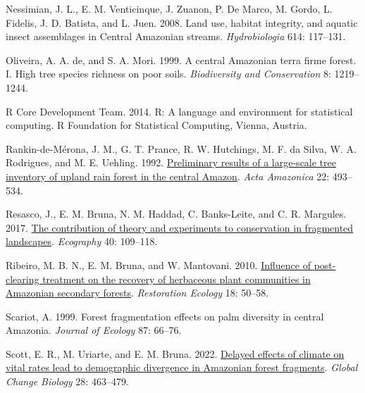 \documentclass[
  12pt,
  man, donotrepeattitle,floatsintext]{apa6}
\newlength{\cslhangindent}
\newlength{\cslentryspacingunit} %
\newenvironment{CSLReferences}[2] %
 {%
  \setlength{\parindent}{0pt}
  \ifodd #1
  \let\oldpar\par
  \def\par{\hangindent=\cslhangindent\oldpar}
  \fi
  \setlength{\parskip}{#2\cslentryspacingunit}
 }%
 {}
\begin{document}
\begin{CSLReferences}{1}{0}
\leavevmode{}%
Nessimian, J. L., E. M. Venticinque, J. Zuanon, P. De Marco, M. Gordo, L. Fidelis, J. D. Batista, and L. Juen. 2008. Land use, habitat integrity, and aquatic insect assemblages in {Central} {Amazonian} streams. \emph{Hydrobiologia} 614: 117--131.

\leavevmode{}%
Oliveira, A. A. de, and S. A. Mori. 1999. A central {Amazonian} terra firme forest. {I}. {High} tree species richness on poor soils. \emph{Biodiversity and Conservation} 8: 1219--1244.

\leavevmode{}%
R Core Development Team. 2014. R: {A} language and environment for statistical computing. R Foundation for Statistical Computing, Vienna, Austria.

\leavevmode{}%
Rankin-de-Mérona, J. M., G. T. Prance, R. W. Hutchings, M. F. da Silva, W. A. Rodrigues, and M. E. Uehling. 1992. \href{https://doi.org/10.1590/1809-43921992224534}{Preliminary results of a large-scale tree inventory of upland rain forest in the central {Amazon}}. \emph{Acta Amazonica} 22: 493--534.

\leavevmode{}%
Resasco, J., E. M. Bruna, N. M. Haddad, C. Banks-Leite, and C. R. Margules. 2017. \href{https://doi.org/10.1111/ecog.02546}{The contribution of theory and experiments to conservation in fragmented landscapes}. \emph{Ecography} 40: 109--118.

\leavevmode{}%
Ribeiro, M. B. N., E. M. Bruna, and W. Mantovani. 2010. \href{https://doi.org/10.1111/j.1526-100X.2010.00715.x}{Influence of post-clearing treatment on the recovery of herbaceous plant communities in {Amazonian} secondary forests}. \emph{Restoration Ecology} 18: 50--58.

\leavevmode{}%
Scariot, A. 1999. Forest fragmentation effects on palm diversity in central {Amazonia}. \emph{Journal of Ecology} 87: 66--76.

\leavevmode{}%
Scott, E. R., M. Uriarte, and E. M. Bruna. 2022. \href{https://doi.org/10.1111/gcb.15900}{Delayed effects of climate on vital rates lead to demographic divergence in {Amazonian} forest fragments}. \emph{Global Change Biology} 28: 463--479.


\end{CSLReferences}
\end{document}

